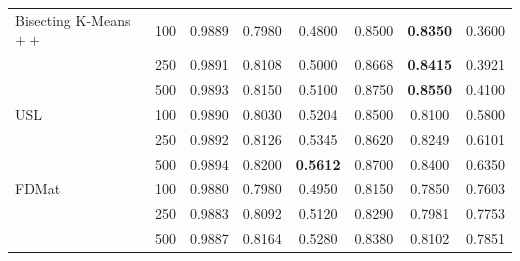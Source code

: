 \documentclass[preprint,12pt]{elsarticle}
\begin{document}
\begin{table}[!t]
{\begin{tabular}{ll|cccccc}
Bisecting K-Means$++$     & 100      & \multicolumn{1}{c|}{0.9889}          & \multicolumn{1}{c|}{0.7980}          & \multicolumn{1}{c|}{0.4800}          & \multicolumn{1}{c|}{0.8500}          & \multicolumn{1}{c|}{\textbf{0.8350}} & 0.3600          \\
                          & 250      & \multicolumn{1}{c|}{0.9891}          & \multicolumn{1}{c|}{0.8108}          & \multicolumn{1}{c|}{0.5000}          & \multicolumn{1}{c|}{0.8668}          & \multicolumn{1}{c|}{\textbf{0.8415}} & 0.3921          \\
                          & 500      & \multicolumn{1}{c|}{0.9893}          & \multicolumn{1}{c|}{0.8150}          & \multicolumn{1}{c|}{0.5100}          & \multicolumn{1}{c|}{0.8750}          & \multicolumn{1}{c|}{\textbf{0.8550}} & 0.4100          \\ \hline
USL                       & 100      & \multicolumn{1}{c|}{0.9890}          & \multicolumn{1}{c|}{0.8030}          & \multicolumn{1}{c|}{0.5204}          & \multicolumn{1}{c|}{0.8500} & \multicolumn{1}{c|}{0.8100}          & 0.5800          \\
                          & 250      & \multicolumn{1}{c|}{0.9892}          & \multicolumn{1}{c|}{0.8126}          & \multicolumn{1}{c|}{0.5345}          & \multicolumn{1}{c|}{0.8620} & \multicolumn{1}{c|}{0.8249}          & 0.6101          \\
                          & 500      & \multicolumn{1}{c|}{0.9894}          & \multicolumn{1}{c|}{0.8200}          & \multicolumn{1}{c|}{\textbf{0.5612}} & \multicolumn{1}{c|}{0.8700} & \multicolumn{1}{c|}{0.8400}          & 0.6350          \\ \hline

FDMat      &  100       & \multicolumn{1}{c|}{0.9880}          & \multicolumn{1}{c|}{0.7980}          & \multicolumn{1}{c|}{0.4950}          & \multicolumn{1}{c|}{0.8150}          & \multicolumn{1}{c|}{0.7850}          &  0.7603          \\
                          &  250       & \multicolumn{1}{c|}{0.9883}          & \multicolumn{1}{c|}{0.8092}          & \multicolumn{1}{c|}{0.5120}          & \multicolumn{1}{c|}{0.8290}          & \multicolumn{1}{c|}{0.7981}          &  0.7753          \\
                          &  500       & \multicolumn{1}{c|}{0.9887}          & \multicolumn{1}{c|}{0.8164}          & \multicolumn{1}{c|}{0.5280}          & \multicolumn{1}{c|}{0.8380}          & \multicolumn{1}{c|}{0.8102}          &  0.7851          \\ \hline


\end{tabular}}
\end{table}
\end{document}
